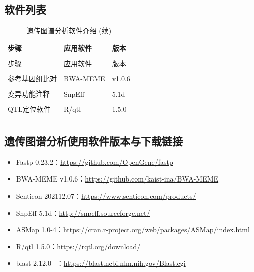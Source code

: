 \documentclass[
  a4paper,
  titlepage]{article}
\begin{document}
\hypertarget{ux8f6fux4ef6ux5217ux8868}{%
\subsection{软件列表}\label{ux8f6fux4ef6ux5217ux8868}}

\begin{longtable}[t]{lll}
\caption{\label{tab:software-table}遗传图谱分析软件介绍}\\
\toprule
步骤 & 应用软件 & 版本\\
\midrule
\endfirsthead
\caption[]{\label{tab:software-table}遗传图谱分析软件介绍 (续)}\\
\toprule
步骤 & 应用软件 & 版本\\
\midrule
\endhead
\hline
\endfoot
\bottomrule
\endlastfoot
\cellcolor{gray!6}{原始数据质控} & \cellcolor{gray!6}{Fastp} & \cellcolor{gray!6}{0.23.2}\\
 
参考基因组比对 & BWA-MEME & v1.0.6\\
 
\cellcolor{gray!6}{SNP/InDel检测} & \cellcolor{gray!6}{Sentieon} & \cellcolor{gray!6}{202112.07}\\
 
变异功能注释 & SnpEff & 5.1d\\
 
\cellcolor{gray!6}{排图软件} & \cellcolor{gray!6}{ASMap} & \cellcolor{gray!6}{1.0-4}\\
 
QTL定位软件 & R/qtl & 1.5.0\\
 
\cellcolor{gray!6}{基因功能注释} & \cellcolor{gray!6}{Blast} & \cellcolor{gray!6}{2.12.0+}\\*
\end{longtable}

\hypertarget{ux9057ux4f20ux56feux8c31ux5206ux6790ux4f7fux7528ux8f6fux4ef6ux7248ux672cux4e0eux4e0bux8f7dux94feux63a5}{%
\subsection{遗传图谱分析使用软件版本与下载链接}\label{ux9057ux4f20ux56feux8c31ux5206ux6790ux4f7fux7528ux8f6fux4ef6ux7248ux672cux4e0eux4e0bux8f7dux94feux63a5}}

\begin{itemize}
\item
  Fastp 0.23.2：\url{https://github.com/OpenGene/fastp}
\item
  BWA-MEME v1.0.6：\url{https://github.com/kaist-ina/BWA-MEME}
\item
  Sentieon 202112.07：\url{https://www.sentieon.com/products/}
\item
  SnpEff 5.1d：\url{http://snpeff.sourceforge.net/}
\item
  ASMap 1.0-4：\url{https://cran.r-project.org/web/packages/ASMap/index.html}
\item
  R/qtl 1.5.0：\url{https://rqtl.org/download/}
\item
  blast 2.12.0+：\url{https://blast.ncbi.nlm.nih.gov/Blast.cgi}
\end{itemize}
\end{document}
